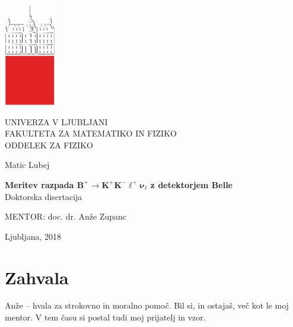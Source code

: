 \cleardoublepage
\begin{otherlanguage}{slovene}
\begin{center}

\includegraphics{fig/logo2}

{\large UNIVERZA V LJUBLJANI\\
FAKULTETA ZA MATEMATIKO IN FIZIKO\\
ODDELEK ZA FIZIKO\\}

\vspace{5cm}

{\Large Matic Lubej\\}

\vspace{10mm}

{\bf \Large Meritev razpada $\bm{B^+ \to K^+K^-\ell^+\nu_\ell}$ z detektorjem Belle\\}
\vspace{5mm}
{\large Doktorska disertacija}\\

\vfill

{\large MENTOR: doc. dr. An\v ze Zupanc\\
}



\vspace{2cm}

{\large Ljubljana, 2018}

\end{center}



\cleardoublepage

\pagestyle{plain}
\vfill
\chapter*{Zahvala}

\noindent Anže -- hvala za strokovno in moralno pomoč. Bil si, in ostajaš, več kot le moj mentor. V tem času si postal tudi moj prijatelj in vzor.\\


\end{otherlanguage}
